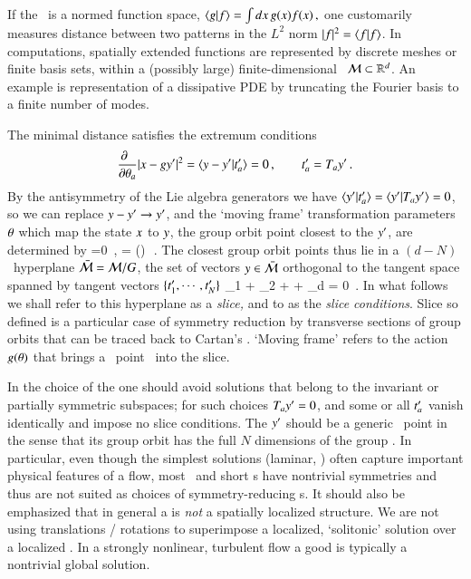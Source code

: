 \documentclass[preprint,12pt]{elsarticle} %
\begin{document}
If the \statesp\ is a normed function space,
\( %
\braket{g}{f} = \int dx \, {g}(x) f(x)
\,,
\) %
one customarily measures distance between two patterns in the $L^2$ norm
$|f|^2 = \braket{f}{f}$. In computations, spatially extended functions are
represented by discrete meshes or finite basis sets, within a (possibly
large) finite-dimensional \statesp\  ${\cal M} \subset \mathbb{R}^d$. An example
is representation of a dissipative PDE by truncating the Fourier basis
 to a finite number of modes.

The minimal distance satisfies the extremum conditions
\[ %
\frac{\partial ~~}{\partial \gSpace_a} |\ssp - \LieEl\slicep|^2
   =
\braket{\sspRed - \slicep}{\sliceTan{a}}
   = 0
    \,,\qquad
	  \sliceTan{a} = \Lg_a \slicep
\,.
\] %
By the antisymmetry of the Lie algebra generators we have
$\braket{\slicep}{\sliceTan{a}} = \braket{\slicep}{\Lg_{a}\slicep}=0$, so
we can replace $y - {y'} \to {\ensuremath{y'}}$, and the
`moving frame' transformation
parameters ${\bf \theta}$ which map the state $x$ to $y$, the group
orbit point closest to the {\template} ${y'}$, are determined by
\beq
{} =0
    \,,\qquad
\sspRed = \LieEl(\gSpace)\,\ssp
\,.
The closest group orbit points thus lie in a $(d\!-\!N)$\dmn\ hyperplane
$\bar{\cal M} = {\cal M}/G$, the set of vectors $y \in  \bar{\cal M}$
orthogonal to the {\template} tangent space spanned by tangent vectors
$\{t'_{1},\cdots,t'_{N}\}$
\beq
\sspRed_1 + \sspRed_2
  + \cdots + \sspRed_d = 0
\,.
In what follows we shall refer to this hyperplane as a \emph{slice,} and
to   as the \emph{slice conditions}. Slice so defined is
a particular case of symmetry reduction by transverse sections of group
orbits that can be traced back to
Cartan's \mframes{}. `Moving frame' refers to the action
$g({\bf \theta})$ that brings a \statesp\ point \ssp\ into the slice.


In the choice of the {\template} one should avoid solutions
that belong to the invariant or partially symmetric subspaces; for such
choices $T_{a}{y'}=0$, and some or all $t'_{a}$ vanish identically
and impose no slice conditions. The {\template} ${y'}$ should be a
generic \statesp\ point in the sense that its group orbit has the full
$N$ dimensions of the group \Group. In particular, even though the
simplest solutions (laminar, \etc) often capture important physical
features of a flow, most \eqva\ and short \po s have nontrivial
symmetries and thus are not suited as choices of symmetry-reducing
{\template s}.
It should also be emphasized that in general a {\template} is \emph{not}
a spatially {localized} structure. We are not using translations /
rotations to superimpose a localized, `solitonic' solution over a
localized {\template}. In a strongly nonlinear, turbulent flow a good
{\template} is typically a nontrivial global solution.
\end{document}
